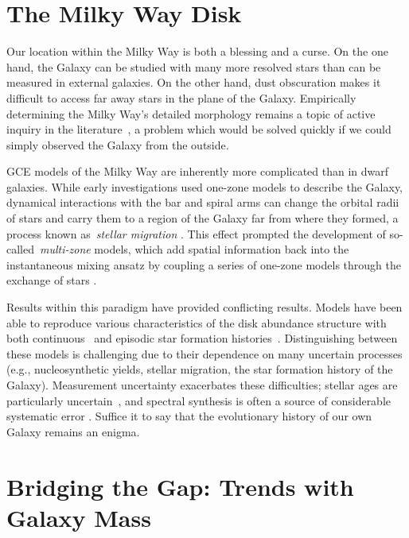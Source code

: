 \documentclass[main.tex]{subfiles}
\begin{document}
\begin{doublespace}
\section{The Milky Way Disk}
\label{main:sec:intro:mw}

Our location within the Milky Way is both a blessing and a curse.
On the one hand, the Galaxy can be studied with many more resolved stars than
can be measured in external galaxies.
On the other hand, dust obscuration makes it difficult to access far away stars
in the plane of the Galaxy.
Empirically determining the Milky Way's detailed morphology remains a topic of
active inquiry in the literature~\citep[e.g.,][]{Nataf2013, Bovy2019,
Shen2020}, a problem which would be solved quickly if we could simply observed
the Galaxy from the outside.
\par
GCE models of the Milky Way are inherently more complicated than in dwarf
galaxies.
While early investigations used one-zone models to describe the Galaxy,
dynamical interactions with the bar and spiral arms can change the orbital
radii of stars and carry them to a region of the Galaxy far from where they
formed, a process known as~\textit{stellar migration}
\citep[e.g.,][]{Sellwood2002, Schoenrich2009a}.
This effect prompted the development of so-called~\textit{multi-zone} models,
which add spatial information back into the instantaneous mixing ansatz by
coupling a series of one-zone models through the exchange of stars
\citep[e.g.,][]{Matteucci1989, Wyse1989, Prantzos1995}.
\par
Results within this paradigm have provided conflicting results.
Models have been able to reproduce various characteristics of the disk abundance
structure with both continuous~\citep[e.g.,][]{Chen2023} and episodic star
formation histories~\citep[e.g.,][]{Spitoni2021}.
Distinguishing between these models is challenging due to their dependence on
many uncertain processes (e.g., nucleosynthetic yields, stellar migration, the
star formation history of the Galaxy).
Measurement uncertainty exacerbates these difficulties; stellar ages are
particularly uncertain~\citep[e.g.,][]{Soderblom2010, Chaplin2013}, and
spectral synthesis is often a source of considerable systematic error
\citep[e.g.,][]{Joensson2018, Eilers2022}.
Suffice it to say that the evolutionary history of our own Galaxy remains an
enigma.

\section{Bridging the Gap: Trends with Galaxy Mass}
\label{main:sec:inro:snrates}


\end{doublespace}
\end{document}
